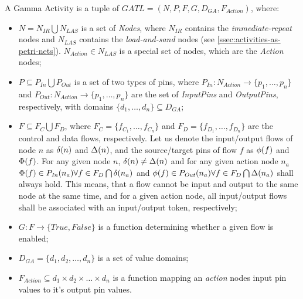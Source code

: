 \begin{definition}
	A Gamma Activity is a tuple of \(\mathit{GATL} = (N, P, F, G, D_\mathit{GA}, F_{Action})\), where:
	
	\begin{itemize}
		\item \(N = N_\mathit{IR} \bigcup N_\mathit{LAS} \) is a set of \emph{Nodes}, where \(N_\mathit{IR}\) contains the \emph{immediate-repeat} nodes and \(N_\mathit{LAS}\) contains the \emph{load-and-sand} nodes (see \autoref{ssec:activities-as-petri-nets}). \(N_\mathit{Action} \in N_\mathit{LAS} \) is a special set of nodes, which are the \emph{Action} nodes;
		\item \( P \subseteq P_\mathit{In} \bigcup P_\mathit{Out} \) is a set of two types of pins, where \(P_\mathit{In} : N_\mathit{Action} \rightarrow \{ p_1, \dots, p_n \} \) and \(P_\mathit{Out} : N_\mathit{Action} \rightarrow \{ p_1, \dots, p_n \} \) are the set of \emph{InputPins} and \emph{OutputPins}, respectively, with domains \(\{ d_1, \dots, d_n \} \subseteq D_\mathit{GA} \);
		\item \( F \subseteq F_C \bigcup F_D \), where \(F_C = \{ f_{C_1}, \dots, f_{C_n} \} \) and \(F_D = \{ f_{D_1}, \dots, f_{D_n} \} \) are the control and data flows, respectively. Let us denote the input/output flows of node \(n\) as \( \delta(n) \) and \( \Delta(n) \), and the source/target pins of flow \(f\) as \( \phi(f) \) and \(\Phi(f)\). For any given node \(n\), \( \delta(n) \neq \Delta(n) \) and for any given action node \(n_a\) \( \Phi(f) \in P_\mathit{In}(n_a) \forall f \in F_D \bigcap \delta(n_a) \) and \( \phi(f) \in P_\mathit{Out}(n_a) \forall f \in F_D \bigcap \Delta(n_a) \) shall always hold. This means, that a flow cannot be input and output to the same node at the same time, and for a given action node, all input/output flows shall be associated with an input/output token, respectively;
		\item \(G : F \rightarrow \{ \mathit{True}, \mathit{False} \} \) is a function determining whether a given flow is enabled;
		\item \(D_\mathit{GA} = \{ d_{1}, d_{2}, \dots, d_{n} \} \) is a set of value domains;
		\item \(F_{Action} \subseteq d_{1} \times d_{2} \times \dots \times d_{n} \) is a function mapping an \emph{action} nodes input pin values to it's output pin values.
	\end{itemize}
	

\end{definition}
